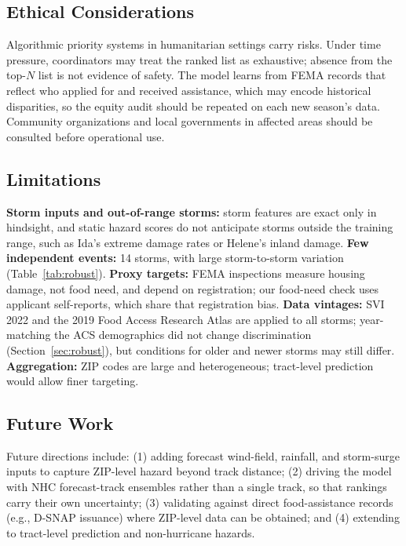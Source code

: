 \documentclass[conference]{IEEEtran}
\renewcommand{\_}{\origunderscore\allowbreak}
\begin{document}
\subsection{Ethical Considerations}
Algorithmic priority systems in humanitarian settings carry
risks. Under time pressure, coordinators may treat the ranked
list as exhaustive; absence from the top-$N$ list is not evidence
of safety. The model learns from FEMA records that reflect who
applied for and received assistance, which may encode historical
disparities, so the equity audit should be repeated on each new
season's data. Community organizations and local governments in
affected areas should be consulted before operational use.

\subsection{Limitations}

\textbf{Storm inputs and out-of-range storms:} storm features are
exact only in hindsight, and static hazard scores do not
anticipate storms outside the training range, such as Ida's
extreme damage rates or Helene's inland damage.
\textbf{Few independent events:} 14 storms, with large
storm-to-storm variation (Table~\ref{tab:robust}).
\textbf{Proxy targets:} FEMA inspections measure housing damage,
not food need, and depend on registration; our food-need check
uses applicant self-reports, which share that registration bias.
\textbf{Data vintages:} SVI 2022 and the 2019 Food Access Research
Atlas are applied to all storms; year-matching the ACS demographics
did not change discrimination (Section~\ref{sec:robust}), but
conditions for older and newer storms may still differ.
\textbf{Aggregation:} ZIP codes are large and heterogeneous;
tract-level prediction would allow finer targeting.

\subsection{Future Work}
Future directions include: (1) adding forecast wind-field, rainfall, and
storm-surge inputs to capture ZIP-level hazard beyond track
distance; (2) driving the model with
NHC forecast-track ensembles rather than a single track, so that
rankings carry their own uncertainty; (3) validating against
direct food-assistance records (e.g., D-SNAP issuance) where
ZIP-level data can be obtained; and (4) extending to
tract-level prediction and non-hurricane hazards.

\end{document}
